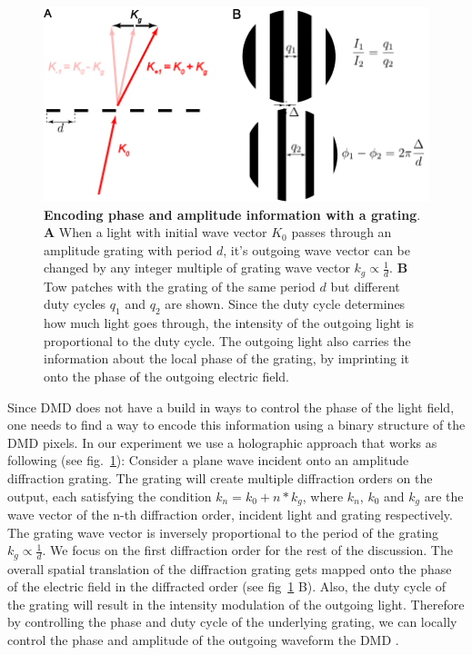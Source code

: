 \begin{figure}[t]
	\centering
	\includegraphics[scale=1]{figures/DMD_grating.pdf}
	\caption{{\bf Encoding phase and amplitude information with a grating}. {\bf A} When a light with initial wave vector $K_0$ passes through an amplitude grating with period $d$, it's outgoing wave vector can be changed by any integer multiple of grating wave vector $k_g\propto \frac{1}{d}$. {\bf B} Tow patches with the grating of the same period $d$ but different duty cycles $q_1$ and $q_2$ are shown. Since the duty cycle determines how much light goes through, the intensity of the outgoing light is proportional to the duty cycle. The outgoing light also carries the information about the local phase of the grating, by imprinting it onto the phase of the outgoing electric field.}
	\label{fig:DMD_grating}
\end{figure}

Since DMD does not have a build in ways to control the phase of the light field, one needs to find a way to encode this information using a binary structure of the DMD pixels. In our experiment we use a holographic approach that works as following (see fig.~\ref{fig:DMD_grating}): Consider a plane wave incident onto an amplitude diffraction grating. The grating will create multiple diffraction orders on the output, each satisfying the condition $k_n = k_0 + n*k_g$, where $k_n$, $k_0$ and $k_g$ are the wave vector of the n-th diffraction order, incident light and grating respectively. The grating wave vector is inversely proportional to the period of the grating $k_g \propto \frac{1}{d}$. We focus on the first diffraction order for the rest of the discussion. The overall spatial translation of the diffraction grating gets mapped onto the phase of the electric field in the diffracted order (see fig~\ref{fig:DMD_grating} B). Also, the duty cycle of the grating will result in the intensity modulation of the outgoing light. Therefore by controlling the phase and duty cycle of the underlying grating, we can locally control the phase and amplitude of the outgoing waveform the DMD \cite{Zupanchich thesis}.


